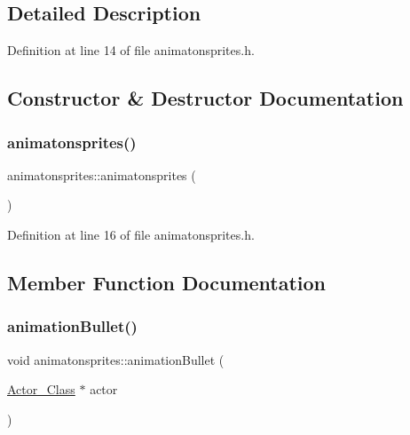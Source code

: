\subsection{Detailed Description}


Definition at line 14 of file animatonsprites.\+h.



\subsection{Constructor \& Destructor Documentation}
\hypertarget{classanimatonsprites_a68866689ab26f4a7fff5d3d44a8c46b9}{}\label{classanimatonsprites_a68866689ab26f4a7fff5d3d44a8c46b9} 
\subsubsection{\texorpdfstring{animatonsprites()}{animatonsprites()}}
{\footnotesize\ttfamily animatonsprites\+::animatonsprites (\begin{DoxyParamCaption}{ }\end{DoxyParamCaption})\hspace{0.3cm}{\ttfamily [inline]}}



Definition at line 16 of file animatonsprites.\+h.



\subsection{Member Function Documentation}
\hypertarget{classanimatonsprites_aeef3560c6b0faaeb00af4a2b88a9ce5d}{}\label{classanimatonsprites_aeef3560c6b0faaeb00af4a2b88a9ce5d} 
\subsubsection{\texorpdfstring{animation\+Bullet()}{animationBullet()}}
{\footnotesize\ttfamily void animatonsprites\+::animation\+Bullet (\begin{DoxyParamCaption}\item[{\hyperlink{class_actor___class}{Actor\+\_\+\+Class} $\ast$}]{actor }\end{DoxyParamCaption})}



